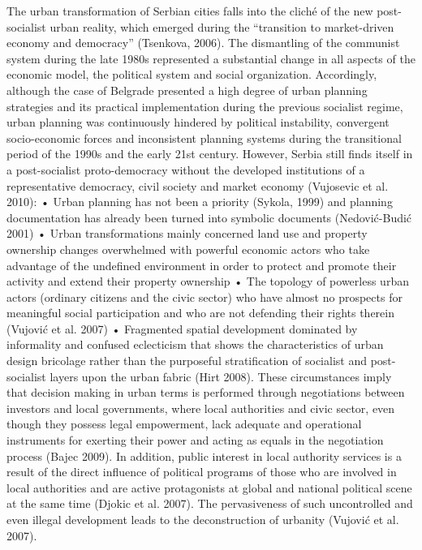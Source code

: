 \documentclass[11pt]{report}
\begin{document}
The urban transformation of Serbian cities falls into the cliché of the new post-socialist urban reality, which emerged during the “transition to market-driven economy and democracy” (Tsenkova, 2006). The dismantling of the communist system during the late 1980s represented a substantial change in all aspects of the economic model, the political system and social organization. Accordingly, although the case of Belgrade presented a high degree of urban planning strategies and its practical implementation during the previous socialist regime, urban planning was continuously hindered by political instability, convergent socio-economic forces and inconsistent planning systems during the transitional period of the 1990s and the early 21st century. 
However, Serbia still finds itself in a post-socialist proto-democracy without the developed institutions of a representative democracy, civil society and market economy (Vujosevic et al. 2010): 
•	Urban planning has not been a priority (Sykola, 1999) and planning documentation has already been turned into symbolic documents (Nedović-Budić 2001) 
•	Urban transformations mainly concerned land use and property ownership changes overwhelmed with powerful economic actors who take advantage of the undefined environment in order to protect and promote their activity and extend their property ownership 
•	The topology of powerless urban actors (ordinary citizens and the civic sector) who have almost no prospects for meaningful social participation and who are not defending their rights therein (Vujović et al. 2007) 
•	Fragmented spatial development dominated by informality and confused eclecticism that shows the characteristics of urban design bricolage rather than the purposeful stratification of socialist and post-socialist layers upon the urban fabric (Hirt 2008). 
These circumstances imply that decision making in urban terms is performed through negotiations between investors and local governments, where local authorities and civic sector, even though they possess legal empowerment, lack adequate and operational instruments for exerting their power and acting as equals in the negotiation process (Bajec 2009). In addition, public interest in local authority services is a result of the direct influence of political programs of those who are involved in local authorities and are active protagonists at global and national political scene at the same time (Djokic et al. 2007). The pervasiveness of such uncontrolled and even illegal development leads to the deconstruction of urbanity (Vujović et al. 2007).
\end{document}
